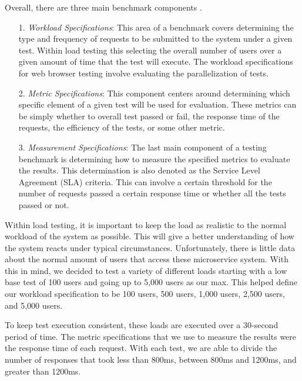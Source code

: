 
Overall, there are three main benchmark components \cite{benchmark_info}. 
\begin{itemize}
    \item[1. ] \textit{Workload Specifications}: This area of a benchmark covers determining the type and frequency of requests to be submitted to the system under a given test. Within load testing this selecting the overall number of users over a given amount of time that the test will execute. The workload specifications for web browser testing involve evaluating the parallelization of tests.
    
    \item[2. ] \textit{Metric Specifications}: This component centers around determining which specific element of a given test will be used for evaluation. These metrics can be simply whether to overall test passed or fail, the response time of the requests, the efficiency of the tests, or some other metric.
    
    \item[3. ] \textit{Measurement Specifications}: The last main component of a testing benchmark is determining how to measure the specified metrics to evaluate the results. This determination is also denoted as the Service Level Agreement (SLA) criteria. This can involve a certain threshold for the number of requests passed a certain response time or whether all the tests passed or not.
    
\end{itemize}

Within load testing, it is important to keep the load as realistic to the normal workload of the system as possible. This will give a better understanding of how the system reacts under typical circumstances. Unfortunately, there is little data about the normal amount of users that access these microservice system. With this in mind, we decided to test a variety of different loads starting with a low base test of 100 users and going up to 5,000 users as our max. This helped define our workload specification to be 100 users, 500 users, 1,000 users, 2,500 users, and 5,000 users. 

To keep test execution consistent, these loads are executed over a 30-second period of time. The metric specifications that we use to measure the results were the response time of each request. With each test, we are able to divide the number of responses that took less than 800ms, between 800ms and 1200ms, and greater than 1200ms. 

